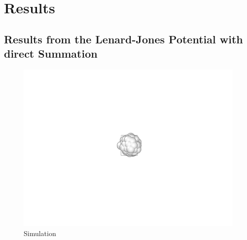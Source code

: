 \chapter{Results}

\section{Results from the Lenard-Jones Potential with direct Summation}

\begin{figure}[!h]
	\begin{center}
		\includegraphics[scale= 1]{Figure/1Image.png}
	\end{center}
	\caption[Simulation]{Simulation }
	\label{SimulationSnapshot1}
\end{figure}

